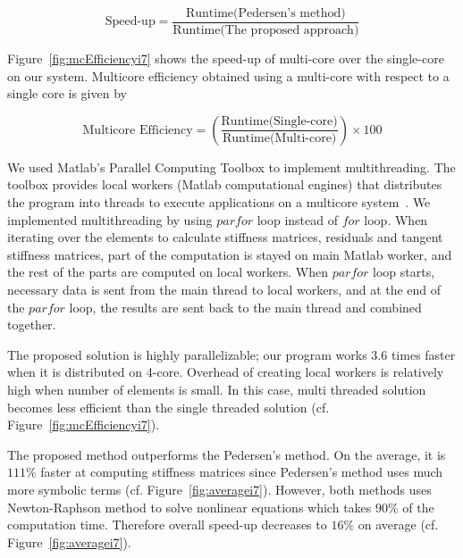 \begin{equation}
\text{Speed-up} = \frac{\text{Runtime(Pedersen's method)}}{\text{Runtime(The proposed approach)}}
\label{eqn:5.2}
\end{equation}

Figure~\ref{fig:mcEfficiencyi7} shows the speed-up of multi-core over the single-core on our system. Multicore efficiency obtained using a multi-core with respect to a single core is given by

\begin{equation}
\text{Multicore Efficiency} = \left(\frac{\text{Runtime(Single-core)}}{\text{Runtime(Multi-core)}}\right) \times 100
\label{eqn:5.3}
\end{equation}

We used Matlab's Parallel Computing Toolbox to implement multithreading. The toolbox provides local workers (Matlab computational engines) that distributes the program into threads to execute applications on a multicore system~\cite{Matlab2011}. We implemented multithreading by using $parfor$ loop instead of $for$ loop. When iterating over the elements to calculate stiffness matrices, residuals and tangent stiffness matrices, part of the computation is stayed on main Matlab worker, and the rest of the parts are computed on local workers. When $parfor$ loop starts, necessary data is sent from the main thread to local workers, and at the end of the $parfor$ loop, the results are sent back to the main thread and combined together.

The proposed solution is highly parallelizable; our program works $3.6$ times faster when it is distributed on 4-core. Overhead of creating local workers is relatively high when number of elements is small. In this case, multi threaded solution becomes less efficient than the single threaded solution (cf. Figure~\ref{fig:mcEfficiencyi7}).

The proposed method outperforms the Pedersen's method. On the average, it is $111\%$ faster at computing stiffness matrices since Pedersen's method uses much more symbolic terms (cf. Figure~\ref{fig:averagei7}). However, both methods uses Newton-Raphson method to solve nonlinear equations which takes $90\%$ of the computation time. Therefore overall speed-up decreases to $16\%$ on average (cf. Figure~\ref{fig:averagei7}).


